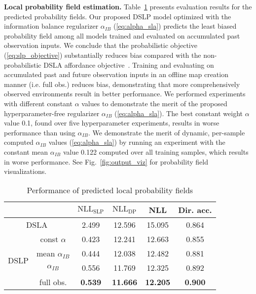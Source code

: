 \documentclass[letterpaper, 10 pt, conference]{ieeeconf}
\begin{document}
\textbf{Local probability field estimation.} Table~\ref{tab:dense_performance} presents evaluation results for the predicted probability fields. Our proposed DSLP model optimized with the information balance regularizer $\alpha_{IB}$ (\ref{eq:alpha_sla}) predicts the least biased probability field among all models trained and evaluated on accumulated past observation inputs. We conclude that the probabilistic objective (\ref{eq:slp_objective}) substantially reduces bias compared with the non-probabilistic DSLA affordance objective~\cite{karlsson2020dsla}.
Training and evaluating on accumulated past and future observation inputs in an offline map creation manner (i.e. full obs.) reduces bias, demonstrating that more comprehensively observed environments result in better performance. 
We performed experiments with different constant $\alpha$ values to demonstrate the merit of the proposed hyperparameter-free regularizer $\alpha_{IB}$ (\ref{eq:alpha_sla}). The best constant weight $\alpha$ value 0.1, found over five hyperparameter experiments, results in worse performance than using $\alpha_{IB}$.
We demonstrate the merit of dynamic, per-sample computed $\alpha_{IB}$ values (\ref{eq:alpha_sla}) by running an experiment with the constant mean $\alpha_{IB}$ value 0.122 computed over all training samples, which results in worse performance.
See Fig.~\ref{fig:output_viz} for probability field visualizations.






\begin{table}[t]\caption{Performance of predicted local probability fields}
\vspace{-4mm}
\begin{center}
\begin{tabular}{|cc|c|c|c|c|}
    \hline
     \multicolumn{2}{|c|}{} & $\text{NLL}_{\text{SLP}}$ & $\text{NLL}_{\text{DP}}$ & NLL & Dir. acc. \\
    \hline
    \multicolumn{2}{|c|}{DSLA~\cite{karlsson2020dsla}} & 2.499 & 12.596 & 15.095 &  0.864 \\
    \hline
    \multirow{4}{*}{DSLP} & const $\alpha$ & 0.423 & 12.241 & 12.663 &  0.855 \\
    \cline{2-6}
    & mean $\alpha_{IB}$ & 0.444 & 12.038 & 12.482 &  0.881 \\
    \cline{2-6}
    & $\alpha_{IB}$ & 0.556 & 11.769 & 12.325 &  0.892 \\
    \cline{2-6}
    & full obs. & \textbf{0.539} & \textbf{11.666} & \textbf{12.205} & \textbf{0.900} \\
    \hline
\end{tabular}
\label{tab:dense_performance}
\end{center}
\vspace{-3mm}
\end{table}
\end{document}
